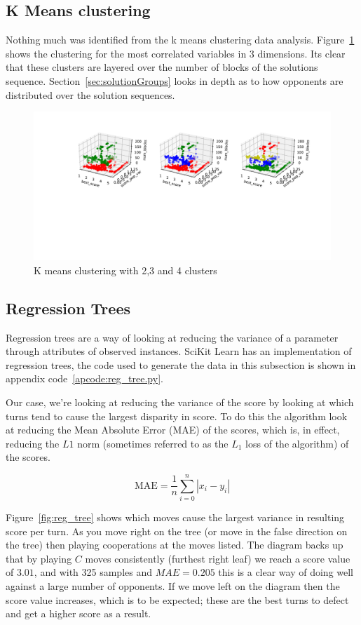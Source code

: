 \subsection{K Means clustering~\cite{bora2014effect}}\label{ssec:k_means}
Nothing much was identified from the k means clustering data analysis.
Figure~\ref{fig:k_means} shows the clustering for the most correlated variables in 3 dimensions.
Its clear that these clusters are layered over the number of blocks of the solutions sequence.
Section~\ref{sec:solutionGroups} looks in depth as to how opponents are distributed over the solution sequences.  

\begin{figure}[ht]
    \includegraphics[width=1.0\textwidth, center]{./img/descriptive/k_means.pdf}
    \caption{K means clustering with 2,3 and 4 clusters}\label{fig:k_means}
\end{figure}

\subsection{Regression Trees}
Regression trees are a way of looking at reducing the variance of a parameter through attributes of observed instances. 
SciKit Learn has an implementation of regression trees, the code used to generate the data in this subsection is shown in appendix code~\ref{apcode:reg_tree.py}.

Our case, we're looking at reducing the variance of the score by looking at which turns tend to cause the largest disparity in score.
To do this the algorithm look at reducing the Mean Absolute Error (MAE) of the scores, which is, in effect, reducing the $L1$ norm (sometimes referred to as the $L_1$ loss of the algorithm) of the scores.

$$\text{MAE} = \frac{1}{n}\sum_{i=0}^n |x_i-y_i|$$

Figure~\ref{fig:reg_tree} shows which moves cause the largest variance in resulting score per turn.
As you move right on the tree (or move in the false direction on the tree) then playing cooperations at the moves listed. 
The diagram backs up that by playing $C$ moves consistently (furthest right leaf) we reach a score value of $3.01$, and with 325 samples and $MAE=0.205$ this is a clear way of doing well against a large number of opponents.
If we move left on the diagram then the score value increases, which is to be expected; these are the best turns to defect and get a higher score as a result.

